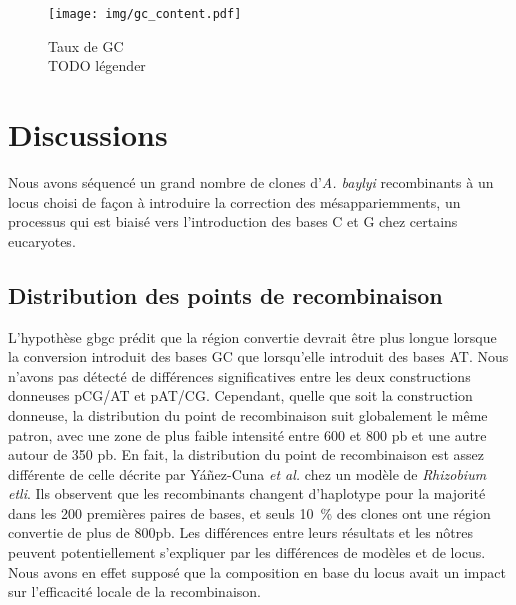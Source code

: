 \null
\vfill


\begin{figure}[htbp]
  \centering


  \texttt{[image: img/gc\_content.pdf]}

  \caption[Taux de GC]{Taux de GC \\
    TODO légender}
  \label{fig:gctaux}
\end{figure}

\vfill
\thispagestyle{empty}
\addtocounter{page}{-1}
\clearpage
\newpage

\section{Discussions}
\label{sec:discussions}

Nous avons séquencé un grand nombre de clones d'\emph{A. baylyi} recombinants à
un locus choisi de façon à introduire la correction des mésappariemments, un
processus qui est biaisé vers l'introduction des bases C et G chez certains
eucaryotes.

\subsection{Distribution des points de recombinaison}

L'hypothèse \ac{gbgc} prédit que la région convertie devrait être plus longue
lorsque la conversion introduit des bases GC que lorsqu'elle introduit des bases
AT. Nous n'avons pas détecté de différences significatives entre les deux
constructions donneuses pCG/AT et pAT/CG. Cependant, quelle que soit la
construction donneuse, la distribution du point de recombinaison suit
globalement le même patron, avec une zone de plus faible intensité entre
\num{600} et \num{800} pb et une autre autour de \num{350} pb. En fait, la
distribution du point de recombinaison est assez différente de celle décrite par
Yáñez-Cuna \emph{et al.}\cite{yanez-cuna_biased_2015} chez un modèle de
\emph{Rhizobium etli}. Ils observent que les recombinants changent d'haplotype
pour la majorité dans les \num{200} premières paires de bases, et seuls
\SI{10}{\percent} des clones ont une région convertie de plus de \num{800}pb.
Les différences entre leurs résultats et les nôtres peuvent potentiellement
s'expliquer par les différences de modèles et de locus. Nous avons en effet
supposé que la composition en base du locus avait un impact sur l'efficacité
locale de la recombinaison.

